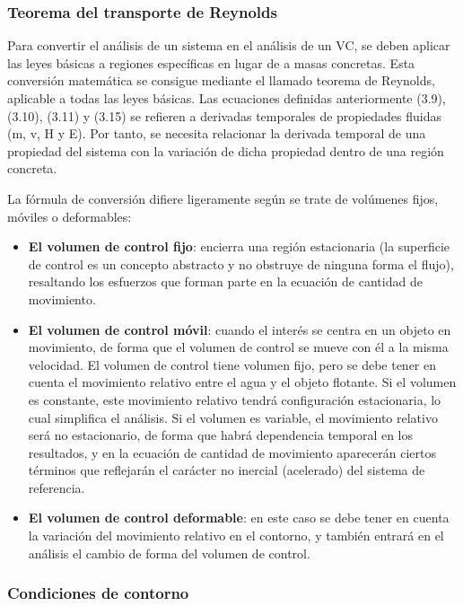 \subsubsection{Teorema del transporte de
Reynolds}\label{header-n347}

Para convertir el análisis de un sistema en el análisis de un VC, se
deben aplicar las leyes básicas a regiones específicas en lugar de a
masas concretas. Esta conversión matemática se consigue mediante el
llamado teorema de Reynolds, aplicable a todas las leyes básicas. Las
ecuaciones definidas anteriormente (3.9), (3.10), (3.11) y (3.15) se
refieren a derivadas temporales de propiedades fluidas (m, v, H y E).
Por tanto, se necesita relacionar la derivada temporal de una propiedad
del sistema con la variación de dicha propiedad dentro de una región
concreta.

La fórmula de conversión difiere ligeramente según se trate de volúmenes
fijos, móviles o deformables:

\begin{itemize}
\item
  \textbf{El volumen de control fijo}: encierra una región estacionaria
  (la superficie de control es un concepto abstracto y no obstruye de
  ninguna forma el flujo), resaltando los esfuerzos que forman parte en
  la ecuación de cantidad de movimiento.
\item
  \textbf{El volumen de control móvil}: cuando el interés se centra en
  un objeto en movimiento, de forma que el volumen de control se mueve
  con él a la misma velocidad. El volumen de control tiene volumen fijo,
  pero se debe tener en cuenta el movimiento relativo entre el agua y el
  objeto flotante. Si el volumen es constante, este movimiento relativo
  tendrá configuración estacionaria, lo cual simplifica el análisis. Si
  el volumen es variable, el movimiento relativo será no estacionario,
  de forma que habrá dependencia temporal en los resultados, y en la
  ecuación de cantidad de movimiento aparecerán ciertos términos que
  reflejarán el carácter no inercial (acelerado) del sistema de
  referencia.
\item
  \textbf{El volumen de control deformable}: en este caso se debe tener
  en cuenta la variación del movimiento relativo en el contorno, y
  también entrará en el análisis el cambio de forma del volumen de
  control.
\end{itemize}

\subsubsection{Condiciones de contorno}\label{header-n365}

